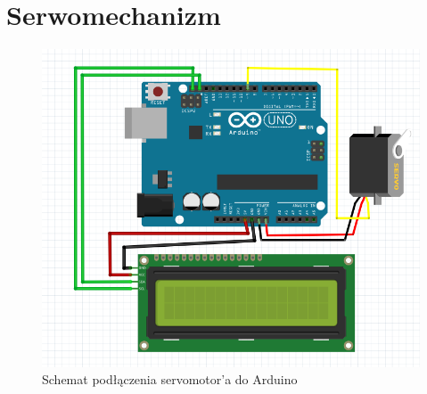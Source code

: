 \documentclass[polish,a4paper]{article}
\begin{document}
	\section{Serwomechanizm}
	\begin{figure}[h!]
		\begin{center}
			\includegraphics[scale=0.35]{02_servo.png}
			\caption*{Schemat podłączenia servomotor'a do Arduino}
		\end{center}
	\end{figure}
\end{document}
